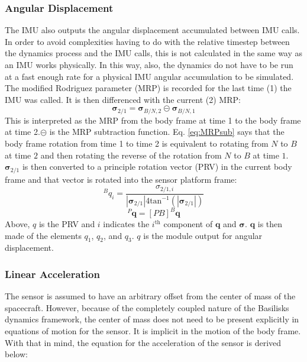 \subsubsection{Angular Displacement}
The IMU also outputs the angular displacement accumulated between IMU calls. In order to avoid complexities having to do with the relative timestep between the dynamics process and the IMU calls, this is not calculated in the same way as an IMU works physically. In this way, also, the dynamics do not have to be run at a fast enough rate for a physical IMU angular accumulation to be simulated. 
The modified Rodriguez parameter (MRP) is recorded for the last time (1) the IMU was called. It is then differenced with the current (2) MRP:
\begin{equation}
	\bm{\sigma}_{2/1} = \bm{\sigma}_{B/N,2}  \circleddash  \bm{\sigma}_{B/N,1}
	\label{eq:MRPsub}
\end{equation}
This is interpreted as the MRP from the body frame at time 1 to the body frame at time 2.$\circleddash$ is the MRP subtraction function.  Eq. \ref{eq:MRPsub} says that the body frame rotation from time 1 to time 2 is equivalent to rotating from $N$ to $B$ at time $2$ and then rotating the reverse of the rotation from $N$ to $B$ at time $1$. $\bm{\sigma}_{2/1}$ is then converted to a principle rotation vector (PRV) in the current body frame and that vector is rotated into the sensor platform frame:
\begin{equation}
		^Bq_{i} = \frac{\sigma_{2/1,i}}{|\bm{\sigma}_{2/1}| 4 \mathrm{tan}^{-1}(|\bm{\sigma}_{2/1}|)}
\end{equation}
\begin{equation}
	^P\bm{q} = [PB] ^B\bm{q}
\end{equation}
Above, $q$ is the PRV and $i$ indicates the $i^{\mathrm{th}}$ component of $\bm{q}$ and $\bm{\sigma}$. $\bm{q}$ is then made of the elements $q_1$, $q_2$, and $q_3$. $q$ is the module output for angular displacement.

\subsubsection{Linear Acceleration}
The sensor is assumed to have an arbitrary offset from the center of mass of the spacecraft. However, because of the completely coupled nature of the Basilisks dynamics framework, the center of mass does not need to be present explicitly in equations of motion for the sensor. It is implicit in the motion of the body frame. With that in mind, the equation for the acceleration of the sensor is derived below:

